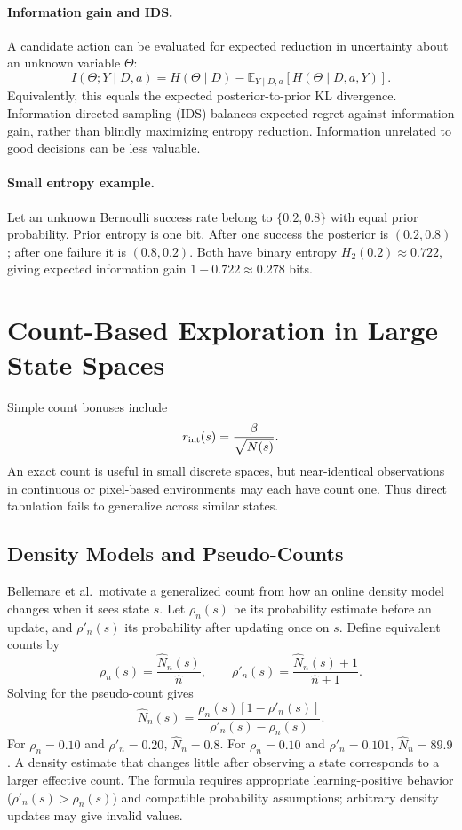 \paragraph{Information gain and IDS.}
A candidate action can be evaluated for expected reduction in uncertainty about an unknown variable $\Theta$:
\[
I(\Theta;Y\mid D,a)=H(\Theta\mid D)
-\mathbb E_{Y\mid D,a}[H(\Theta\mid D,a,Y)].
\]
Equivalently, this equals the expected posterior-to-prior KL divergence. Information-directed sampling (IDS) balances expected regret against information gain, rather than blindly maximizing entropy reduction. Information unrelated to good decisions can be less valuable.

\paragraph{Small entropy example.}
Let an unknown Bernoulli success rate belong to $\{0.2,0.8\}$ with equal prior probability. Prior entropy is one bit. After one success the posterior is $(0.2,0.8)$; after one failure it is $(0.8,0.2)$. Both have binary entropy $H_2(0.2)\approx0.722$, giving expected information gain $1-0.722\approx0.278$ bits.

\section{Count-Based Exploration in Large State Spaces}
Simple count bonuses include
\[
r_{\rm int}(s)=\frac{\beta}{\sqrt{N(s)}}.
\]
An exact count is useful in small discrete spaces, but near-identical observations in continuous or pixel-based environments may each have count one. Thus direct tabulation fails to generalize across similar states.

\subsection{Density Models and Pseudo-Counts}
Bellemare et al.\ motivate a generalized count from how an online density model changes when it sees state $s$. Let $\rho_n(s)$ be its probability estimate before an update, and $\rho'_n(s)$ its probability after updating once on $s$. Define equivalent counts by
\[
\rho_n(s)=\frac{\hat N_n(s)}{\hat n},\qquad
\rho'_n(s)=\frac{\hat N_n(s)+1}{\hat n+1}.
\]
Solving for the pseudo-count gives
\[
\boxed{\hat N_n(s)=
\frac{\rho_n(s)[1-\rho'_n(s)]}{\rho'_n(s)-\rho_n(s)}}.
\]
For $\rho_n=0.10$ and $\rho'_n=0.20$, $\hat N_n=0.8$. For $\rho_n=0.10$ and $\rho'_n=0.101$, $\hat N_n=89.9$. A density estimate that changes little after observing a state corresponds to a larger effective count. The formula requires appropriate learning-positive behavior ($\rho'_n(s)>\rho_n(s)$) and compatible probability assumptions; arbitrary density updates may give invalid values.

